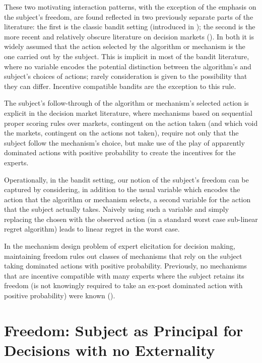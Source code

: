 These two motivating interaction patterns, with the exception of the emphasis on the subject's freedom, are found reflected in two previously separate parts of the literature: the first is the classic bandit setting (introduced in \cite{thompson:33}); the second is the more recent and relatively obscure literature on decision markets (\cite{berg2003prediction,hanson2002decision,othman2010decision,boutilier2012eliciting,chen2014eliciting}). In both it is widely assumed that the action selected by the algorithm or mechanism is the one carried out by the subject. This is implicit in most of the bandit literature, where no variable encodes the potential distinction between the algorithm's and subject's choices of actions; rarely consideration is given to the possibility that they can differ. Incentive compatible bandits \cite{kremer2014implementing,mansour2015bayesian,mansour2016bayesian} are the exception to this rule.

The subject's follow-through of the algorithm or mechanism's selected action is explicit in the decision market literature, where mechanisms based on sequential proper scoring rules over markets, contingent on the action taken (and which void the markets, contingent on the actions not taken), require not only that the subject follow the mechanism's choice, but make use of the play of apparently dominated actions with positive probability to create the incentives for the experts.

Operationally, in the bandit setting, our notion of the subject's freedom can be captured by considering, in addition to the usual variable which encodes the action that the algorithm  or mechanism selects, a second variable for the action that the subject actually takes. Naively using such a variable and simply replacing the chosen with the observed action (in a standard worst case sub-linear regret algorithm) leads to linear regret in the worst case.

In the mechanism design problem of expert elicitation for decision making, maintaining freedom rules out classes of mechanisms that rely on the subject taking dominated actions with positive probability. Previously, no mechanisms that are incentive compatible with many experts where the subject retains its freedom (is not knowingly required to take an ex-post dominated action with positive probability) were known (\cite{othman2010decision,chen2014eliciting}).



\section{Freedom: Subject as Principal for Decisions with no Externality}

